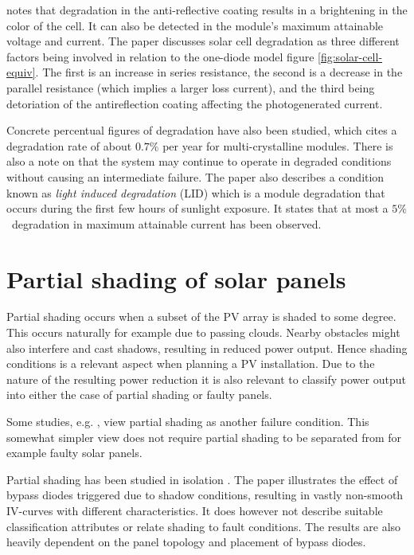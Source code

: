 \cite{Meyer2004} notes that degradation in the anti-reflective coating results in a brightening in the color of the cell.
It can also be detected in the module's maximum attainable voltage and current.
The paper discusses solar cell degradation as three different factors being involved in relation to the one-diode model figure \ref{fig:solar-cell-equiv}.
The first is an increase in series resistance, the second is a decrease in the parallel resistance (which implies a larger loss current), and the third being detoriation of the antireflection coating affecting the photogenerated current.

Concrete percentual figures of degradation have also been studied\cite{Quintana2002}, which cites a degradation rate of about $0.7\%$ per year for multi-crystalline modules.
There is also a note on that the system may continue to operate in degraded conditions without causing an intermediate failure.
The paper also describes a condition known as \emph{light induced degradation} (LID) which is a module degradation
that occurs during the first few hours of sunlight exposure.
It states that at most a $5\%$ degradation in maximum attainable current has been observed.

\section{Partial shading of solar panels}
Partial shading occurs when a subset of the PV array is shaded to some degree.
This occurs naturally for example due to passing clouds.
Nearby obstacles might also interfere and cast shadows, resulting in reduced power output.
Hence shading conditions is a relevant aspect when planning a PV installation.
Due to the nature of the resulting power reduction it is also relevant to classify power output into either the case of partial shading or faulty panels.

Some studies, e.g. \cite{Stettler2005}, view partial shading as another failure condition.
This somewhat simpler view does not require partial shading to be separated from for example faulty solar panels.

Partial shading has been studied in isolation \cite{Alsayid2013}.
The paper illustrates the effect of bypass diodes triggered due to shadow conditions, resulting in vastly non-smooth IV-curves with different characteristics.
It does however not describe suitable classification attributes or relate shading to fault conditions.
The results are also heavily dependent on the panel topology and placement of bypass diodes.

